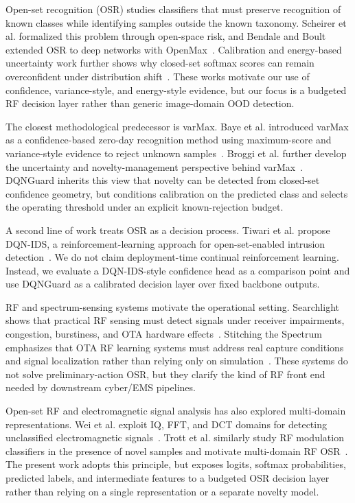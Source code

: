 Open-set recognition (OSR) studies classifiers that must preserve recognition of known classes while identifying samples outside the known taxonomy. Scheirer et al. formalized this problem through open-space risk, and Bendale and Boult extended OSR to deep networks with OpenMax~\cite{scheirer2013toward,bendale2016openmax}. Calibration and energy-based uncertainty work further shows why closed-set softmax scores can remain overconfident under distribution shift~\cite{guo2017calibration,liu2020energy,wang2021eow}. These works motivate our use of confidence, variance-style, and energy-style evidence, but our focus is a budgeted RF decision layer rather than generic image-domain OOD detection.

The closest methodological predecessor is varMax. Baye et al. introduced varMax as a confidence-based zero-day recognition method using maximum-score and variance-style evidence to reject unknown samples~\cite{baye2024varmax}. Broggi et al. further develop the uncertainty and novelty-management perspective behind varMax~\cite{broggi2025varmax}. DQNGuard inherits this view that novelty can be detected from closed-set confidence geometry, but conditions calibration on the predicted class and selects the operating threshold under an explicit known-rejection budget.

A second line of work treats OSR as a decision process. Tiwari et al. propose DQN-IDS, a reinforcement-learning approach for open-set-enabled intrusion detection~\cite{tiwaridqn}. We do not claim deployment-time continual reinforcement learning. Instead, we evaluate a DQN-IDS-style confidence head as a comparison point and use DQNGuard as a calibrated decision layer over fixed backbone outputs.

RF and spectrum-sensing systems motivate the operational setting. Searchlight shows that practical RF sensing must detect signals under receiver impairments, congestion, burstiness, and OTA hardware effects~\cite{bell2023searchlight}. Stitching the Spectrum emphasizes that OTA RF learning systems must address real capture conditions and signal localization rather than relying only on simulation~\cite{uvaydov2024stitching}. These systems do not solve preliminary-action OSR, but they clarify the kind of RF front end needed by downstream cyber/EMS pipelines.

Open-set RF and electromagnetic signal analysis has also explored multi-domain representations. Wei et al. exploit IQ, FFT, and DCT domains for detecting unclassified electromagnetic signals~\cite{wei2024multidomain}. Trott et al. similarly study RF modulation classifiers in the presence of novel samples and motivate multi-domain RF OSR~\cite{trott2026model}. The present work adopts this principle, but exposes logits, softmax probabilities, predicted labels, and intermediate features to a budgeted OSR decision layer rather than relying on a single representation or a separate novelty model.

